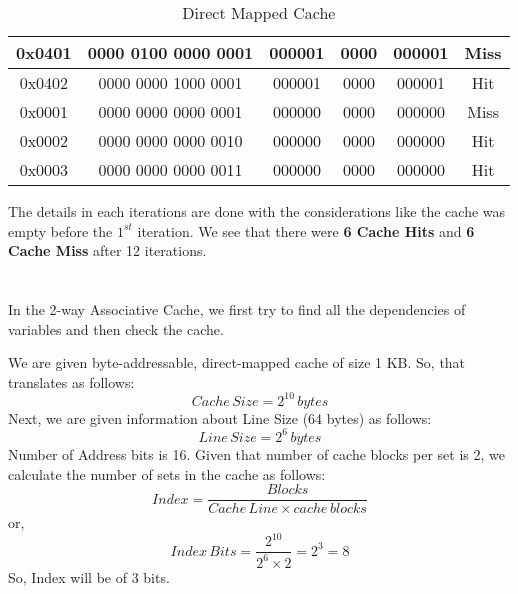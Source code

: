 \documentclass[12pt]{article}
\begin{document}
\begin{table}[]
\begin{center}
\begin{tabular}{|c|c|c|c|c|c|}
0x0401           & 0000 0100 0000 0001 & 000001            & 0000                                                                      & 000001                                                              & Miss              \\ \hline
0x0402           & 0000 0000 1000 0001 & 000001            & 0000                                                                      & 000001                                                              & Hit               \\ \hline
0x0001           & 0000 0000 0000 0001 & 000000            & 0000                                                                      & 000000                                                              & Miss              \\ \hline
0x0002           & 0000 0000 0000 0010 & 000000            & 0000                                                                      & 000000                                                              & Hit               \\ \hline
0x0003           & 0000 0000 0000 0011 & 000000            & 0000                                                                      & 000000                                                              & Hit               \\ \hline
\end{tabular}
\caption{Direct Mapped Cache}
\end{center}
\end{table}

The details in each iterations are done with the considerations like the cache was empty before the $1^{st}$ iteration. We see that there were \textbf{6 Cache Hits} and \textbf{6 Cache Miss} after 12 iterations.
\section{}

In the 2-way Associative Cache, we first try to find all the dependencies of variables and then check the cache.

We are given byte-addressable, direct-mapped cache of size 1 KB. So, that translates as follows:
\begin{equation*}
    Cache \, Size = 2^{10} \, bytes
\end{equation*}
Next, we are given information about Line Size (64 bytes) as follows:
\begin{equation*}
    Line \, Size = 2^6 \, bytes
\end{equation*}
Number of Address bits is 16. Given that number of cache blocks per set is 2, we calculate the number of sets in the cache as follows:
\begin{equation*}
    Index = \frac{Blocks}{Cache \, Line \times cache \, blocks}
\end{equation*}
or,
\begin{equation*}
    Index \, Bits = \frac{2^{10}}{2^6 \times 2} = 2^3 = 8
\end{equation*}
So, Index will be of 3 bits.
	
\end{document}
